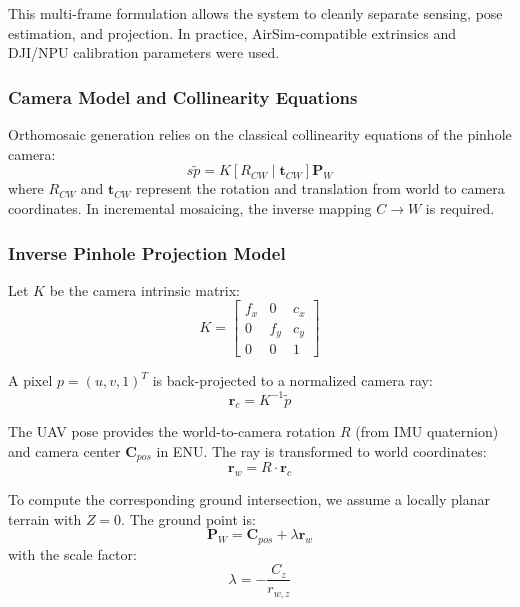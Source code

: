 \documentclass[conference]{IEEEtran}
\begin{document}
This multi-frame formulation allows the system to cleanly separate sensing, pose estimation, and projection. In practice, AirSim-compatible extrinsics and DJI/NPU calibration parameters were used.

\subsubsection{Camera Model and Collinearity Equations}
Orthomosaic generation relies on the classical collinearity equations of the pinhole camera:
\begin{equation}
s \tilde{p} = K [R_{CW} \mid \mathbf{t}_{CW}] \mathbf{P}_W
\end{equation}
where $R_{CW}$ and $\mathbf{t}_{CW}$ represent the rotation and translation from world to camera coordinates. In incremental mosaicing, the inverse mapping $C \rightarrow W$ is required.

\subsubsection{Inverse Pinhole Projection Model}
Let $K$ be the camera intrinsic matrix:
\begin{equation}
K = \begin{bmatrix}
f_x & 0 & c_x \\
0 & f_y & c_y \\
0 & 0 & 1
\end{bmatrix}
\end{equation}

A pixel $p = (u, v, 1)^T$ is back-projected to a normalized camera ray:
\begin{equation}
\mathbf{r}_c = K^{-1} \tilde{p}
\end{equation}

The UAV pose provides the world-to-camera rotation $R$ (from IMU quaternion) and camera center $\mathbf{C}_{pos}$ in ENU. The ray is transformed to world coordinates:
\begin{equation}
\mathbf{r}_w = R \cdot \mathbf{r}_c
\end{equation}

To compute the corresponding ground intersection, we assume a locally planar terrain with $Z = 0$. The ground point is:
\begin{equation}
\mathbf{P}_{W} = \mathbf{C}_{pos} + \lambda \mathbf{r}_w
\end{equation}
with the scale factor:
\begin{equation}
\lambda = -\frac{C_z}{r_{w,z}}
\end{equation}
\end{document}
